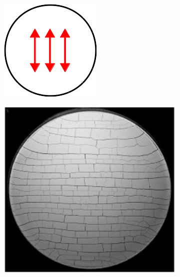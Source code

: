 \begin{figure}[htb!]
    \begin{subfigure}{0.18\textwidth}
        \includegraphics[width=\textwidth]{past/figures/brick_schematic.png}
    \end{subfigure}
    \begin{subfigure}{0.18\textwidth}
        \includegraphics[width=\textwidth]{past/figures/paste_brick.png}

\end{subfigure}
\end{figure}
